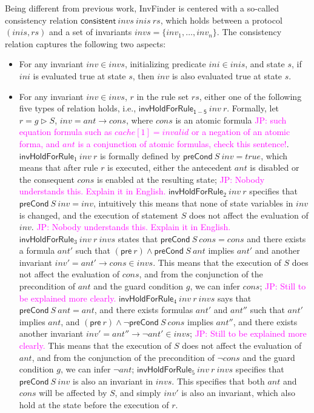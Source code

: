 \documentclass{llncs}
\newcommand\JP[1]{\textcolor{magenta}{JP: #1}}
\begin{document}
Being different from previous work, {\sf InvFinder} is centered with
a so-called consistency relation $\mathsf{consistent}~ invs ~inis~
rs$,
 which holds between a protocol $(inis,rs)$ and
a set of invariants $invs=\{inv_1,\ldots, inv_n\}$.
The consistency relation captures the following two aspects:
%
\begin{itemize}
\item For any invariant $inv \in invs$,
initializing predicate $ini \in inis$, and
state $s$, if $ini$ is evaluated true at state $s$, then $inv$ is
also evaluated true at state $s$.

\item For any invariant $inv \in invs$, $r$ in the rule set
$rs$, either one of the following five types of relation holds,
i.e., $\mathsf{invHoldForRule_{1-5}}~inv~ r$.
%
%
Formally, let $r=g \vartriangleright  S$, $inv=ant \longrightarrow
cons$, where $cons$ is an atomic formula \JP{such equation formula
such as $cache[1]=invalid$ or a negation of an atomic forma, and
$ant$ is a conjunction of atomic formulas, check this sentence!}.
$\mathsf{invHoldForRule}_1~inv~ r$ is formally defined by
 $\mathsf{preCond}~S~inv=true$, which means that after rule $r$ is executed,
either the antecedent $ant$ is disabled or the consequent $cons$ is
enabled at the resulting state;
 \JP{Nobody understands this. Explain it in English.}
 $\mathsf{invHoldForRule}_2~inv~ r$ specifies that
 $\mathsf{preCond}~S~inv=inv$, intuitively this means that none of state variables in $inv$ is
 changed, and the execution of statement $S$ does not affect the
 evaluation of $inv$.
  \JP{Nobody understands this. Explain it in English.}
 $\mathsf{invHoldForRule}_3~inv~ r~invs$ states
  that $\mathsf{preCond}~S~cons=cons$ and there exists a formula $ant'$ such that
$(\mathsf{pre}~r )\wedge \mathsf{preCond}~S~ant$ implies $ant'$ and
another invariant $inv'=ant' \longrightarrow cons \in invs$. This
means that the execution of $S$ does not affect the evaluation of
$cons$, and from the conjunction of the precondition of $ant$ and
the guard condition $g$, we can infer $cons$;
 \JP{Still to be explained more clearly.}
$\mathsf{invHoldForRule}_4~inv~ r~invs$ says
  that $\mathsf{preCond}~S~ant=ant$, and there exists formulas
  $ant'$ and $ant''$
such that  $ant'$ implies $ant$, and $(\mathsf{pre}~r )\wedge \neg
\mathsf{preCond}~S~cons$ implies  $ant''$, and there exists another
invariant $inv'=ant'' \longrightarrow \neg ant' \in invs$;
 \JP{Still to be explained more clearly.} This
means that the execution of $S$ does not affect the evaluation of
$ant$, and from the conjunction of the precondition of $\neg cons$
and the guard condition $g$, we can infer $\neg ant$;
$\mathsf{invHoldForRule}_5~inv~ r~invs$ specifies that
$\mathsf{preCond}~S~inv$ is also an invariant in  $invs$. This
specifies that both $ant$ and $cons$ will be affected by $S$, and
simply $inv'$ is also an invariant, which also hold at the state
before the execution of $r$.
\end{itemize}
\end{document}

